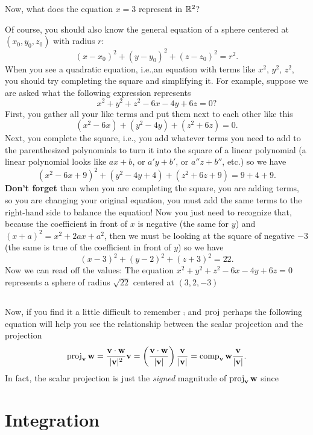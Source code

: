 Now, what does the equation $x=3$ represent in $\mathbb{R}^2$?

Of course, you should also know the general equation of a sphere centered at
$(x_0,y_0,z_0)$ with radius $r$:
\begin{equation}
  \label{eq:sphere}
(x-x_0)^2+(y-y_0)^2+(z-z_0)^2=r^2.
\end{equation}
When you see a quadratic equation, i.e.,an equation with terms like $x^2$,
$y^2$, $z^2$, you should try completing the square and simplifying it. For
example, suppose we are asked what the following expression represents
\[
x^2+y^2+z^2-6x-4y+6z=0?
\]
First, you gather all your like terms and put them next to each other like
this
\[
\left(x^2-6x\right)+\left(y^2-4y\right)+\left(z^2+6z\right)=0.
\]
Next, you complete the square, i.e., you add whatever terms you need to add
to the parenthesized polynomials to turn it into the square of a linear
polynomial (a linear polynomial looks like $ax+b$, or $a'y+b'$, or
$a''z+b''$, etc.) so we have
\[
(x^2-6x+9)^2+(y^2-4y+4)+(z^2+6z+9)=9+4+9.
\]
\textbf{Don't forget} than when you are completing the square, you are
adding terms, so you are changing your original equation, you must add the
same terms to the right-hand side to balance the equation! Now you just
need to recognize that, because the coefficient in front of $x$ is negative
(the same for $y$) and $(x+a)^2=x^2+2ax+a^2$, then we must be looking at
the square of negative $-3$ (the same is true of the coefficient in front
of $y$) so we have
\[
(x-3)^2+(y-2)^2+(z+3)^2=22.
\]
Now we can read off the values: The equation $x^2+y^2+z^2-6x-4y+6z=0$
represents a sphere of radius $\sqrt{22}$ centered at $(3,2,-3)$

\subsection{}
Now, if you find it a little difficult to remember \underline{$\comp$} and
\underline{$\operatorname{proj}$} perhaps the following equation will help you see the
relationship between the scalar projection and the projection
\begin{equation}
  \label{eq:comp-to-proj}
\operatorname{proj}_{\mathbf{v}}\mathbf{w}=
\frac{\mathbf{v}\cdot\mathbf{w}}{|\mathbf{v}|^2}\mathbf{v}=
\left(\frac{\mathbf{v}\cdot\mathbf{w}}{|\mathbf{v}|}\right)\frac{\mathbf{v}}{|\mathbf{v}|}
=\operatorname{comp}_{\mathbf{v}}\mathbf{w}\frac{\mathbf{v}}{|\mathbf{v}|}.
\end{equation}
In fact, the scalar projection is just the \emph{signed} magnitude of
$\operatorname{proj}_{\mathbf{v}}\mathbf{w}$ since

\section{Integration}

